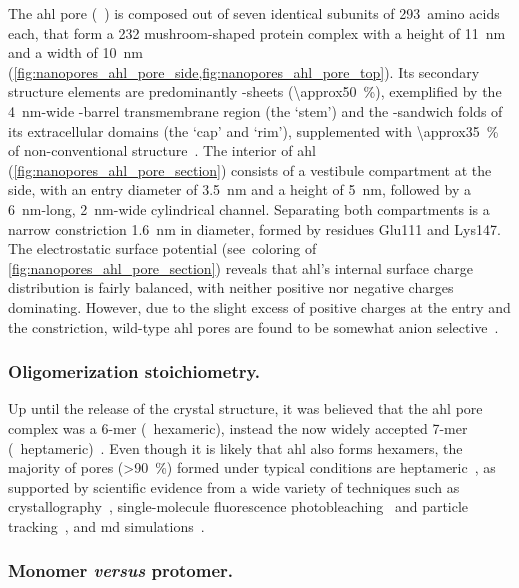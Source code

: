 The \gls{ahl} pore (~\cite{Song-1996}) is composed out of seven identical subunits of 293~amino
acids each, that form a \SI{232}{\kDa} mushroom-shaped protein complex with a height of \SI{11}{\nm} and a
width of \SI{10}{\nm} (\cref{fig:nanopores_ahl_pore_side,fig:nanopores_ahl_pore_top}). Its secondary structure
elements are predominantly \tb-sheets (\SI{\approx50}{\percent}), exemplified by the \SI{4}{\nm}-wide
\tb-barrel transmembrane region (the `stem') and the \tb-sandwich folds of its extracellular domains (the
`cap' and `rim'), supplemented with \SI{\approx35}{\percent} of non-conventional structure~\cite{Song-1996}.
The interior of \gls{ahl} (\cref{fig:nanopores_ahl_pore_section}) consists of a vestibule compartment at the
\cisi{} side, with an entry diameter of \SI{3.5}{\nm} and a height of \SI{5}{\nm}, followed by a
\SI{6}{\nm}-long, \SI{2}{\nm}-wide cylindrical channel. Separating both compartments is a narrow constriction
\SI{1.6}{\nm} in diameter, formed by residues Glu111 and Lys147. The electrostatic surface potential
(see~coloring of \cref{fig:nanopores_ahl_pore_section}) reveals that \gls{ahl}'s internal surface charge
distribution is fairly balanced, with neither positive nor negative charges dominating. However, due to the
slight excess of positive charges at the \cisi{} entry and the constriction, wild-type \gls{ahl} pores are
found to be somewhat anion selective~\cite{Menestrina-1986}.


\subsubsection{Oligomerization stoichiometry.}
%

Up until the release of the crystal structure, it was believed that the \gls{ahl} pore complex was a 6-mer
(\ie~hexameric), instead the now widely accepted 7-mer (\ie~heptameric)~\cite{Song-1996}. Even though it is
likely that \gls{ahl} also forms hexamers, the majority of pores (\SI{>90}{\percent}) formed under typical
conditions are heptameric~\cite{Menestrina-1986}, as supported by scientific evidence from a wide variety of
techniques such as crystallography~\cite{Song-1996,Galdiero-2004}, single-molecule fluorescence
photobleaching~\cite{Das-2007} and particle tracking~\cite{Thompson-2011}, and \gls{md}
simulations~\cite{Aksimentiev-2005,Bhattacharya-2011,Basdevant-2019}. 


\subsubsection{Monomer \textit{versus} protomer.}
%

